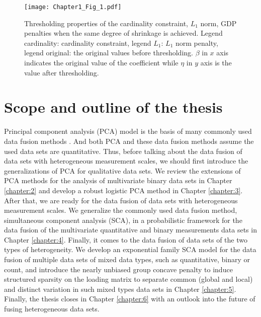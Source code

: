 \begin{figure}[htbp]
    \centering
    \texttt{[image: Chapter1\_Fig\_1.pdf]}
    \caption{Thresholding properties of the cardinality constraint, $L_{1}$ norm, GDP penalties when the same degree of shrinkage is achieved. Legend cardinality: cardinality constraint, legend $L_{1}$: $L_{1}$ norm penalty, legend original: the original values before thresholding. $\beta$ in $x$ axis indicates the original value of the coefficient while $\eta$ in $y$ axis is the value after thresholding.}
    \label{chapter1_fig:1}
\end{figure}

\section{Scope and outline of the thesis}
Principal component analysis (PCA) model is the basis of many commonly used data fusion methods \cite{maage2019performance}. And both PCA and these data fusion methods assume the used data sets are quantitative. Thus, before talking about the data fusion of data sets with heterogeneous measurement scales, we should first introduce the generalizations of PCA for qualitative data sets. We review the extensions of PCA methods for the analysis of multivariate binary data sets in Chapter \ref{chapter:2} and develop a robust logistic PCA method in Chapter \ref{chapter:3}. After that, we are ready for the data fusion of data sets with heterogeneous measurement scales. We generalize the commonly used data fusion method, simultaneous component analysis (SCA), in a probabilistic framework for the data fusion of the multivariate quantitative and binary measurements data sets in Chapter \ref{chapter:4}. Finally, it comes to the data fusion of data sets of the two types of heterogeneity. We develop an exponential family SCA model for the data fusion of multiple data sets of mixed data types, such as quantitative, binary or count, and introduce the nearly unbiased group concave penalty to induce structured sparsity on the loading matrix to separate common (global and local) and distinct variation in such mixed types data sets in Chapter \ref{chapter:5}. Finally, the thesis closes in Chapter \ref{chapter:6} with an outlook into the future of fusing heterogeneous data sets. 